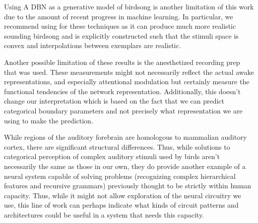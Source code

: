 Using A DBN as a generative model of birdsong is another limitation of this work due to the amount of recent progress in machine learning. In particular, we recommend using \cite{GAIA} for these techniques as it can produce much more realistic sounding birdsong and is explicitly constructed such that the stimuli space is convex and interpolations between exemplars are realistic. 

Another possible limitation of these results is the anesthetized recording prep that was used. These measurements might not necessarily reflect the actual awake representations, and especially attentional modulation but certainly measure the functional tendencies of the network representation\cite{Emily's attention paper?, Dan's chronic paper?}. Additionally, this doesn't change our interpretation which is based on the fact that we can predict categorical boundary parameters and not precisely what representation we are using to make the prediction.

While regions of the auditory forebrain are homologous to mammalian auditory cortex\cite{wang2010laminar}, there are significant structural differences. Thus, while solutions to categorical perception of complex auditory stimuli used by birds aren't necessarily the same as those in our own, they do provide another example of a neural system capable of solving problems (recognizing complex hierarchical features and recursive grammars) previously thought to be strictly within human capacity. Thus, while it might not allow exploration of the neural circuitry we use, this line of work can perhaps indicate what kinds of circuit patterns and architectures could be useful in a system that needs this capacity.